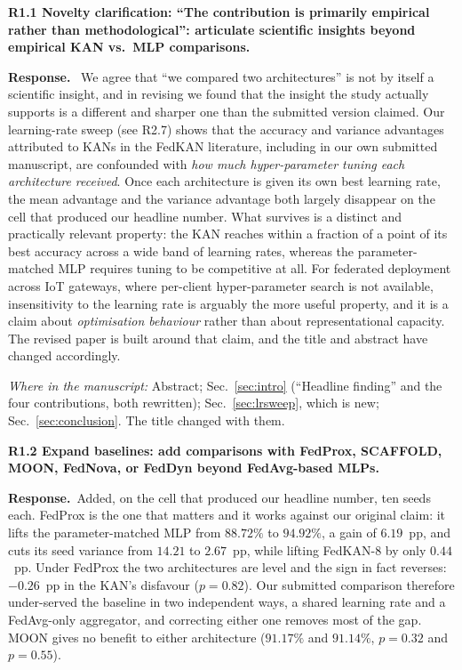 \documentclass[11pt]{article}
\newcommand{\rc}[1]{\medskip\noindent\textbf{\textcolor[rgb]{0.35,0.35,0.35}{#1}}\par\nopagebreak}
\newcommand{\reply}{\medskip\noindent\textbf{Response.}\ }
\newcommand{\where}[1]{\par\smallskip\noindent\emph{Where in the manuscript:} #1\par}
\begin{document}
\rc{R1.1 Novelty clarification: ``The contribution is primarily empirical rather than
methodological'': articulate scientific insights beyond empirical KAN vs.\ MLP
comparisons.}
\reply 
We agree that ``we compared two architectures'' is not by itself a scientific insight, and
in revising we found that the insight the study actually supports is a different and
sharper one than the submitted version claimed. Our learning-rate sweep (see R2.7) shows
that the accuracy and variance advantages attributed to KANs in the FedKAN literature,
including in our own submitted manuscript, are confounded with \emph{how much
hyper-parameter tuning each architecture received}. Once each architecture is given its
own best learning rate, the mean advantage and the variance advantage both largely
disappear on the cell that produced our headline number. What survives is a distinct and
practically relevant property: the KAN reaches within a fraction of a point of its best
accuracy across a wide band of learning rates, whereas the parameter-matched MLP requires
tuning to be competitive at all. For federated deployment across IoT gateways, where
per-client hyper-parameter search is not available, insensitivity to the learning rate is
arguably the more useful property, and it is a claim about \emph{optimisation behaviour}
rather than about representational capacity. The revised paper is built around that claim,
and the title and abstract have changed accordingly.
\where{Abstract; Sec.~\ref{sec:intro} (``Headline finding'' and the four contributions, both rewritten); Sec.~\ref{sec:lrsweep}, which is new; Sec.~\ref{sec:conclusion}. The title changed with them.}

\rc{R1.2 Expand baselines: add comparisons with FedProx, SCAFFOLD, MOON, FedNova, or
FedDyn beyond FedAvg-based MLPs.}
\reply Added, on the cell that produced our headline number, ten seeds each. FedProx is the one that
matters and it works against our original claim: it lifts the parameter-matched MLP from
$88.72\%$ to $94.92\%$, a gain of $6.19$~pp, and cuts its seed variance from $14.21$ to
$2.67$~pp, while lifting FedKAN-8 by only $0.44$~pp. Under FedProx the two architectures are
level and the sign in fact reverses: $-0.26$~pp in the KAN's disfavour ($p=0.82$). Our
submitted comparison therefore under-served the baseline in two independent ways, a shared
learning rate and a FedAvg-only aggregator, and correcting either one removes most of the gap.
MOON gives no benefit to either architecture ($91.17\%$ and $91.14\%$, $p=0.32$ and $p=0.55$).
\end{document}
